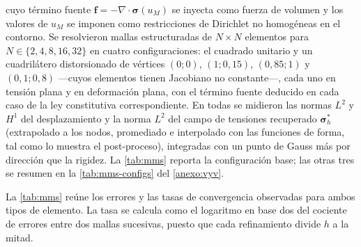 cuyo término fuente $\bm{f} = -\nabla\cdot\bm{\sigma}(u_M)$ se inyecta como fuerza de volumen y los valores de $u_M$ se imponen como restricciones de Dirichlet no homogéneas en el contorno. Se resolvieron mallas estructuradas de $N\times N$ elementos para $N\in\{2,4,8,16,32\}$ en cuatro configuraciones: el cuadrado unitario y un cuadrilátero distorsionado de vértices $(0;0)$, $(1;0{,}15)$, $(0{,}85;1)$ y $(0{,}1;0{,}8)$ —cuyos elementos tienen Jacobiano no constante—, cada uno en tensión plana y en deformación plana, con el término fuente deducido en cada caso de la ley constitutiva correspondiente. En todas se midieron las normas $L^2$ y $H^1$ del desplazamiento y la norma $L^2$ del campo de tensiones recuperado $\bm{\sigma}^*_h$ (extrapolado a los nodos, promediado e interpolado con las funciones de forma, tal como lo muestra el post-proceso), integradas con un punto de Gauss más por dirección que la rigidez. La \autoref{tab:mms} reporta la configuración base; las otras tres se resumen en la \autoref{tab:mms-configs} del \autoref{anexo:vyv}.

La \autoref{tab:mms} reúne los errores y las tasas de convergencia observadas para ambos tipos de elemento. La tasa se calcula como el logaritmo en base dos del cociente de errores entre dos mallas sucesivas, puesto que cada refinamiento divide $h$ a la mitad.

